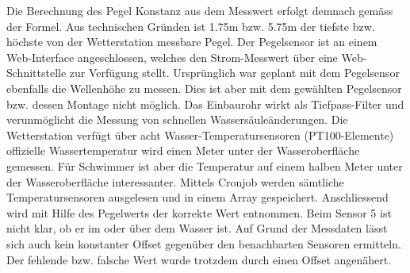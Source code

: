 \documentclass[11pt]{article}
\begin{document}
\begin{multicols}{2}
Die Berechnung des Pegel Konstanz aus dem Messwert erfolgt demnach gemäss der Formel. Aus technischen Gründen ist 1.75m bzw. 5.75m der tiefste bzw. höchste von der Wetterstation messbare Pegel. Der Pegelsensor ist an einem Web-Interface angeschlossen, welches den Strom-Messwert über eine Web-Schnittstelle zur Verfügung stellt. Ursprünglich war geplant mit dem Pegelsensor ebenfalls die Wellenhöhe zu messen. Dies ist aber mit dem gewählten Pegelsensor bzw. dessen Montage nicht möglich. Das Einbaurohr wirkt als Tiefpass-Filter und verunmöglicht die Messung von schnellen Wassersäuleänderungen. Die Wetterstation verfügt über acht Wasser-Temperatursensoren (PT100-Elemente) offizielle Wassertemperatur wird einen Meter unter der Wasseroberfläche gemessen. Für Schwimmer ist aber die Temperatur auf einem halben Meter unter der Wasseroberfläche interessanter.  Mittels Cronjob werden sämtliche Temperatursensoren ausgelesen und in einem Array gespeichert. Anschliessend wird mit Hilfe des Pegelwerts der korrekte Wert entnommen. Beim Sensor 5 ist nicht klar, ob er im oder über dem Wasser ist. Auf Grund der Messdaten lässt sich auch kein konstanter Offset gegenüber den benachbarten Sensoren ermitteln. Der fehlende bzw. falsche Wert wurde trotzdem durch einen Offset angenähert.


\end{multicols}
\end{document}
